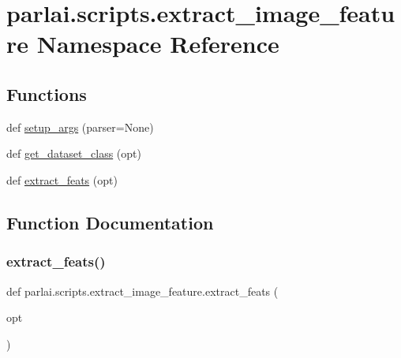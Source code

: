 \hypertarget{namespaceparlai_1_1scripts_1_1extract__image__feature}{}\section{parlai.\+scripts.\+extract\+\_\+image\+\_\+feature Namespace Reference}
\label{namespaceparlai_1_1scripts_1_1extract__image__feature}
\subsection*{Functions}
\begin{DoxyCompactItemize}
\item 
def \hyperlink{namespaceparlai_1_1scripts_1_1extract__image__feature_ab634fcc65758e30deaf92980edcc20bd}{setup\+\_\+args} (parser=None)
\item 
def \hyperlink{namespaceparlai_1_1scripts_1_1extract__image__feature_a4fa5d8aef45056034f4898531a0f9967}{get\+\_\+dataset\+\_\+class} (opt)
\item 
def \hyperlink{namespaceparlai_1_1scripts_1_1extract__image__feature_a6e3b12d361756ec79fbd44abd185387b}{extract\+\_\+feats} (opt)
\end{DoxyCompactItemize}


\subsection{Function Documentation}
\mbox{\label{namespaceparlai_1_1scripts_1_1extract__image__feature_a6e3b12d361756ec79fbd44abd185387b}} 
\subsubsection{\texorpdfstring{extract\+\_\+feats()}{extract\_feats()}}
{\footnotesize\ttfamily def parlai.\+scripts.\+extract\+\_\+image\+\_\+feature.\+extract\+\_\+feats (\begin{DoxyParamCaption}\item[{}]{opt }\end{DoxyParamCaption})}



